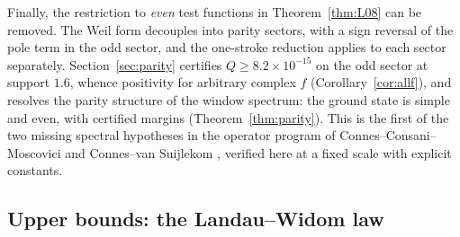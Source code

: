﻿\documentclass[11pt]{article}
\begin{document}
Finally, the restriction to \emph{even} test functions in
Theorem~\ref{thm:L08} can be removed.  The Weil form decouples into
parity sectors, with a sign reversal of the pole term in the odd
sector, and the one-stroke reduction applies to each sector
separately.  Section~\ref{sec:parity} certifies
$Q\ge8.2\times10^{-15}$ on the odd sector at support $1.6$, whence
positivity for arbitrary complex $f$ (Corollary~\ref{cor:allf}), and
resolves the parity structure of the window spectrum: the ground
state is simple and even, with certified margins
(Theorem~\ref{thm:parity}).  This is the first of the two missing
spectral hypotheses in the operator program of
Connes--Consani--Moscovici \cite{CCMZeta2025} and
Connes--van Suijlekom \cite{ConnesVanSuijlekom2025}, verified here at
a fixed scale with explicit constants.

\subsection{Upper bounds: the Landau--Widom law}
\label{sec:intro-upper}
\end{document}

